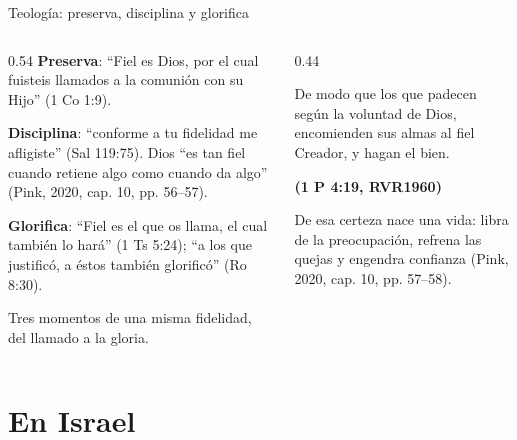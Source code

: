 \documentclass[hyperref={bookmarks=false},aspectratio=169]{beamer}
\newcommand{\fuente}[1]{\par\hfill{\upshape\bfseries\footnotesize\textcolor{azul}{#1}}}
\newcommand{\destacar}[1]{\textbf{\textcolor{azul}{#1}}}
\begin{document}
\begin{frame}{Teología: preserva, disciplina y glorifica}
\begin{columns}[t,onlytextwidth]
\begin{column}{0.54\textwidth}\small
\destacar{Preserva}: ``Fiel es Dios, por el cual fuisteis llamados a la comunión con su Hijo'' (1 Co 1:9).\par\smallskip
\destacar{Disciplina}: ``conforme a tu fidelidad me afligiste'' (Sal 119:75). Dios ``es tan fiel cuando retiene algo como cuando da algo'' (Pink, 2020, cap. 10, pp. 56--57).\par\smallskip
\destacar{Glorifica}: ``Fiel es el que os llama, el cual también lo hará'' (1 Ts 5:24); ``a los que justificó, a éstos también glorificó'' (Ro 8:30).\par\medskip
Tres momentos de una misma fidelidad, del llamado a la gloria.
\end{column}
\begin{column}{0.44\textwidth}
\begin{cita}De modo que los que padecen según la voluntad de Dios, encomienden sus almas al fiel Creador, y hagan el bien.\fuente{(1 P 4:19, RVR1960)}\end{cita}
\scriptsize De esa certeza nace una vida: libra de la preocupación, refrena las quejas y engendra confianza (Pink, 2020, cap. 10, pp. 57--58).
\end{column}
\end{columns}
\end{frame}

\section{En Israel}
\end{document}
